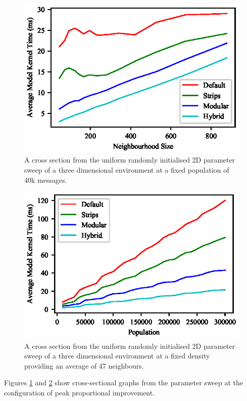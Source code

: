 \begin{figure}[!t]
\centering
\includegraphics[width=\linewidth]{../resources/results/3d/40k_messages.eps}
\caption{\label{fig:graph-3d-40kmessage-uniformrandom}A cross section from the uniform randomly initialised 2D parameter sweep of a three dimensional environment at a fixed population of 40k messages.}
\end{figure}
\begin{figure}[!t]
\centering
\includegraphics[width=\linewidth]{../resources/results/3d/47_neighbours.eps}
\caption{\label{fig:graph-3d-47neighbours-uniformrandom}A cross section from the uniform randomly initialised 2D parameter sweep of a three dimensional environment at a fixed  density providing an average of 47 neighbours.}
\end{figure}
      Figures \ref{fig:graph-3d-40kmessage-uniformrandom} and \ref{fig:graph-3d-47neighbours-uniformrandom} show cross-sectional graphs from the parameter sweep at the configuration of peak proportional improvement.
      
